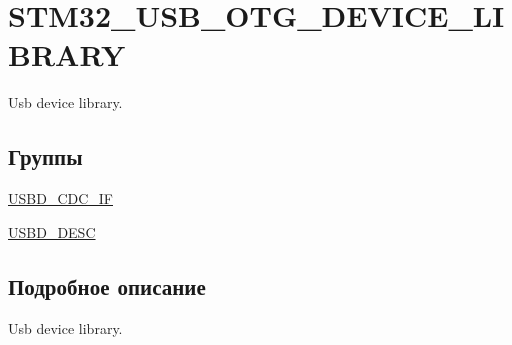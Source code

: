 \hypertarget{group___s_t_m32___u_s_b___o_t_g___d_e_v_i_c_e___l_i_b_r_a_r_y}{
\section{STM32\_\-USB\_\-OTG\_\-DEVICE\_\-LIBRARY}
\label{group___s_t_m32___u_s_b___o_t_g___d_e_v_i_c_e___l_i_b_r_a_r_y}
}
Usb device library.  


\subsection*{Группы}
\begin{CompactItemize}
\item 
\hyperlink{group___u_s_b_d___c_d_c___i_f}{USBD\_\-CDC\_\-IF}
\item 
\hyperlink{group___u_s_b_d___d_e_s_c}{USBD\_\-DESC}
\end{CompactItemize}


\subsection{Подробное описание}
Usb device library. 